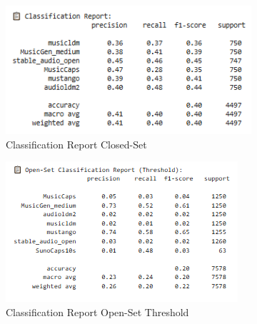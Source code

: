 \documentclass[conference]{IEEEtran}  %
\begin{document}
\begin{figure}
    \vspace{0.8em} %

    \begin{subfigure}[b]{0.32\textwidth}
        \centering
        \includegraphics[width=\linewidth]{Figures/ReportClosedSet.PNG}
        \caption{Classification Report Closed-Set}
        \label{fig: Closed-Set Report}
    \end{subfigure}%
    \hfill
    \begin{subfigure}[b]{0.32\textwidth}
        \centering
        \includegraphics[width=\linewidth]{Figures/OpenSetThreshold.PNG} %
        \caption{Classification Report Open-Set Threshold} %
        \label{fig: Open-Set Threshold Report}
    \end{subfigure}%
    \hfill
    \begin{subfigure}[b]{0.32\textwidth}

\end{subfigure}
\end{figure}
\end{document}
